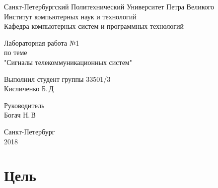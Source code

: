 \documentclass[12pt,a4paper]{scrartcl}
\begin{document}
\begin{titlepage}
  \begin{center}
    Санкт-Петербургский Политехнический Университет     Петра Великого \\
    
    Институт компьютерных наук и технологий \\
    
    Кафедра компьютерных систем и программных технологий
  \end{center}
  
  \vfill
  
  \begin{center}
  Лабораторная работа №1\\
  по теме\\
  "Сигналы телекоммуникационных
систем"\\
\end{center}

\vfill

\newlength{\ML}
\hfill\begin{minipage}{0.4\textwidth}
  Выполнил студент группы 33501/3\\
  \underline{\hspace{\ML}} Кисличенко Б.\,Д\\
\end{minipage}%

\bigskip

\hfill\begin{minipage}{0.4\textwidth}
  Руководитель\\
  \underline{\hspace{\ML}} Богач Н.\,В\\
\end{minipage}%

\vfill
 
\begin{center}
  Санкт-Петербург\\
2018 
\end{center}

\end{titlepage}

\section{Цель}
\label{sec:goal}
\end{document}
